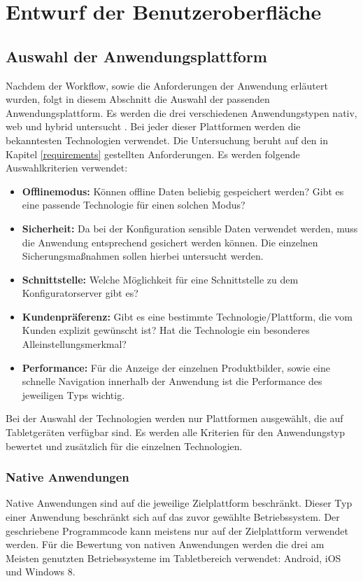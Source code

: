 \chapter{Entwurf der Benutzeroberfläche}\label{chapter_4}

\section{Auswahl der Anwendungsplattform}
Nachdem der Workflow, sowie die Anforderungen der Anwendung erläutert wurden, folgt in diesem Abschnitt die Auswahl der passenden Anwendungsplattform. Es werden die drei verschiedenen Anwendungstypen nativ, web und hybrid untersucht \cite{bib:mobilePlattform}. Bei jeder dieser Plattformen werden die bekanntesten Technologien verwendet. Die Untersuchung beruht auf den in Kapitel \ref{requirements} gestellten Anforderungen. Es werden folgende Auswahlkriterien verwendet:
\begin{itemize}
        \item \textbf{Offlinemodus:} Können offline Daten beliebig gespeichert werden? Gibt es eine passende Technologie für einen solchen Modus?
        
        \item \textbf{Sicherheit:} Da bei der Konfiguration sensible Daten verwendet werden, muss die Anwendung entsprechend gesichert werden können. Die einzelnen Sicherungsmaßnahmen sollen hierbei untersucht werden.
        
        \item \textbf{Schnittstelle:} Welche Möglichkeit für eine Schnittstelle zu dem Konfiguratorserver gibt es? 
        
        \item \textbf{Kundenpräferenz:} Gibt es eine bestimmte Technologie/Plattform, die vom Kunden explizit gewünscht ist? Hat die Technologie ein besonderes Alleinstellungsmerkmal?
        
        \item \textbf{Performance:} Für die Anzeige der einzelnen Produktbilder, sowie eine schnelle Navigation innerhalb der Anwendung ist die Performance des jeweiligen Typs wichtig.      
        
\end{itemize}
Bei der Auswahl der Technologien werden nur Plattformen ausgewählt, die auf Tabletgeräten verfügbar sind. Es werden alle Kriterien für den Anwendungstyp bewertet und zusätzlich für die einzelnen Technologien.


\subsection{Native Anwendungen}
Native Anwendungen sind auf die jeweilige Zielplattform beschränkt. Dieser Typ einer Anwendung beschränkt sich auf das zuvor gewählte Betriebssystem. Der geschriebene Programmcode kann meistens nur auf der Zielplattform verwendet werden. Für die Bewertung von nativen Anwendungen werden die drei am Meisten genutzten Betriebssysteme im Tabletbereich verwendet: Android, iOS und Windows 8\cite{bib:nativeBS}. \par

